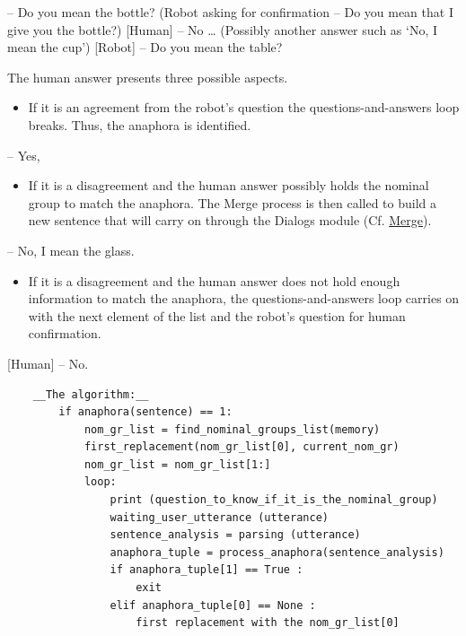 \documentclass[twoside,a4paper,10pt]{report}
\newcommand{\dokuitem}{\item}
\begin{document}
\small
\begin{verbatimtab}
  [Robot] – Do you mean the bottle? (Robot asking for confirmation – Do you mean that I give you
the bottle?)
  [Human] – No … (Possibly another answer such as ‘No, I mean the cup’)
  [Robot] – Do you mean the table?
\end{verbatimtab}
\normalsize

The human answer presents three possible aspects.


\begin{itemize}
\dokuitem  If it is an agreement from the robot’s question the questions-and-answers loop breaks. Thus, the anaphora is identified.
\end{itemize}

\small
\begin{verbatimtab}
  [Human] – Yes,
\end{verbatimtab}
\normalsize

\begin{itemize}
\dokuitem  If it is a disagreement and the human answer possibly holds the nominal group to match the anaphora. The Merge process is then called to build a new sentence that will carry on through the Dialogs module (Cf. \hyperref[65464c31b2e6ac04da1fcaa37c9bd9c7]{Merge}).
\end{itemize}

\small
\begin{verbatimtab}
  [Human] – No, I mean the glass.
\end{verbatimtab}
\normalsize

\begin{itemize}
\dokuitem  If it is a disagreement and the human answer does not hold enough information to match the anaphora, the questions-and-answers loop carries on with the next element of the list and the robot’s question for human confirmation.
\end{itemize}

    [Human] – No.


\lstset{language=python}
\begin{lstlisting}
	__The algorithm:__
		if anaphora(sentence) == 1:
			nom_gr_list = find_nominal_groups_list(memory)
			first_replacement(nom_gr_list[0], current_nom_gr)
			nom_gr_list = nom_gr_list[1:]
			loop:
				print (question_to_know_if_it_is_the_nominal_group)
				waiting_user_utterance (utterance)
				sentence_analysis = parsing (utterance)
				anaphora_tuple = process_anaphora(sentence_analysis)
				if anaphora_tuple[1] == True :
					exit
				elif anaphora_tuple[0] == None :
					first replacement with the nom_gr_list[0]

\end{lstlisting}
\end{document}
